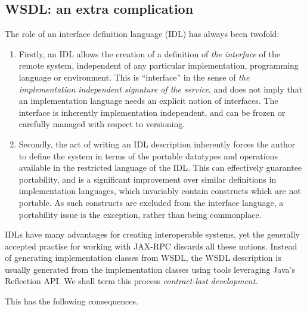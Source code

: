 \subsection{WSDL: an extra complication}
\label{objections:wsdl-gen}

The role of an interface definition language (IDL) has always been
twofold:

\begin{enumerate}
\item Firstly, an IDL allows the creation of a definition of \emph{the
interface} of the remote system, independent of any particular
implementation, programming language or environment. This is
``interface'' in the sense of \emph{the implementation independent
signature of the service}, and does not imply that an implementation
language needs an explicit notion of interfaces. The interface is
inherently implementation independent, and can be frozen or carefully
managed with respect to versioning.

\item Secondly, the act of writing an IDL description inherently
forces the author to define the system in terms of the portable
datatypes and operations available in the restricted language of the
IDL.  This can effectively guarantee portability, and is a significant
improvement over similar definitions in implementation languages,
which invariably contain constructs which are not portable. As such
constructs are excluded from the interface language, a portability
issue is the exception, rather than being commonplace.
\end{enumerate}

IDLs have many advantages for creating interoperable systems, yet the
generally accepted practise for working with JAX-RPC discards all
these notions. Instead of generating implementation classes from WSDL,
the WSDL description is usually generated from the implementation
classes using tools leveraging Java's Reflection API. We shall term
this process \emph{contract-last development}.

This has the following consequences.

